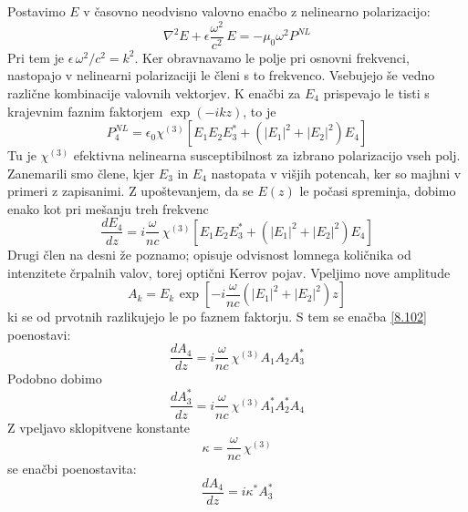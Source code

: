 Postavimo $E$ v časovno neodvisno valovno enačbo z nelinearno polarizacijo:
\begin{equation}
\nabla^{2}E+\epsilon\frac{\omega^{2}}{c^{2}}\, E=-\mu_{0}\omega^{2}P^{NL}\label{8.100}
\end{equation}
 Pri tem je $\epsilon\,\omega^{2}/c^{2}=k^{2}$. Ker obravnavamo le
polje pri osnovni frekvenci, nastopajo v nelinearni polarizaciji le
členi s to frekvenco. Vsebujejo še vedno različne kombinacije valovnih
vektorjev. K enačbi za $E_{4}$ prispevajo le tisti s krajevnim faznim
faktorjem $\exp(-ikz)$, to je 
\begin{equation}
P_{4}^{NL}=\epsilon_{0}\chi^{\left(3\right)}[E_{1}E_{2}E_{3}^{*}+(\left|E_{1}\right|^{2}+\left|E_{2}\right|^{2})E_{4}]\label{8.101}
\end{equation}
 Tu je $\chi^{\left(3\right)}$ efektivna nelinearna susceptibilnost
za izbrano polarizacijo vseh polj. Zanemarili smo člene, kjer $E_{3}$
in $E_{4}$ nastopata v višjih potencah, ker so majhni v primeri z
zapisanimi. Z upoštevanjem, da se $E\left(z\right)$ le počasi spreminja,
dobimo enako kot pri mešanju treh frekvenc 
\begin{equation}
\frac{dE_{4}}{dz}=i\frac{\omega}{nc}\,\chi^{\left(3\right)}\left[E_{1}E_{2}E_{3}^{*}+(\left|E_{1}\right|^{2}+\left|E_{2}\right|^{2})E_{4}\right]\label{8.102}
\end{equation}
 Drugi člen na desni že poznamo; opisuje odvisnost lomnega količnika
od intenzitete črpalnih valov, torej optični Kerrov pojav. Vpeljimo
nove amplitude 
\begin{equation}
A_{k}=E_{k\,}\exp\left[-i\frac{\omega}{nc}\left(\left|E_{1}\right|^{2}+\left|E_{2}\right|^{2}\right)z\right]\label{8.103}
\end{equation}
 ki se od prvotnih razlikujejo le po faznem faktorju. S tem se enačba
\ref{8.102} poenostavi: 
\begin{equation}
\frac{dA_{4}}{dz}=i\frac{\omega}{nc}\,\chi^{\left(3\right)}A_{1}A_{2}A_{3}^{*}\label{8.104}
\end{equation}
 Podobno dobimo 
\begin{equation}
\frac{dA_{3}^{*}}{dz}=i\frac{\omega}{nc}\,\chi^{\left(3\right)}A_{1}^{*}A_{2}^{*}A_{4}\label{8.105}
\end{equation}
 Z vpeljavo sklopitvene konstante 
\begin{equation}
\kappa=\frac{\omega}{nc}\,\chi^{\left(3\right)}\label{8.106}
\end{equation}
 se enačbi poenostavita: 
\[
\frac{dA_{4}}{dz}=i\kappa^{*}A_{3}^{*}
\]
 

